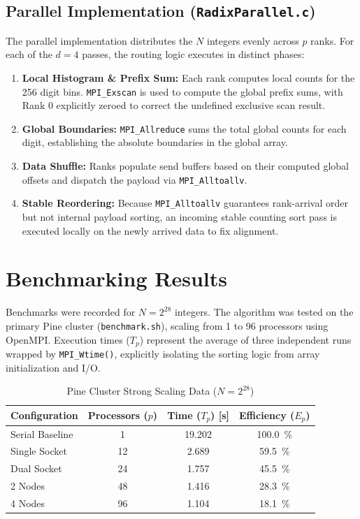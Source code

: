 \documentclass[11pt]{article}
\begin{document}
\subsection{Parallel Implementation (\texttt{RadixParallel.c})}
The parallel implementation distributes the $N$ integers evenly across $p$ ranks. For each of the $d=4$ passes, the routing logic executes in distinct phases:
\begin{enumerate}
  \item \textbf{Local Histogram \& Prefix Sum:} Each rank computes local counts for the 256 digit bins. \texttt{MPI\_Exscan} is used to compute the global prefix sums, with Rank 0 explicitly zeroed to correct the undefined exclusive scan result.
  \item \textbf{Global Boundaries:} \texttt{MPI\_Allreduce} sums the total global counts for each digit, establishing the absolute boundaries in the global array.
  \item \textbf{Data Shuffle:} Ranks populate send buffers based on their computed global offsets and dispatch the payload via \texttt{MPI\_Alltoallv}.
  \item \textbf{Stable Reordering:} Because \texttt{MPI\_Alltoallv} guarantees rank-arrival order but not internal payload sorting, an incoming stable counting sort pass is executed locally on the newly arrived data to fix alignment.
\end{enumerate}

\section{Benchmarking Results}
Benchmarks were recorded for $N = 2^{28}$ integers. The algorithm was tested on the primary Pine cluster (\texttt{benchmark.sh}), scaling from 1 to 96 processors using OpenMPI. Execution times ($T_p$) represent the average of three independent runs wrapped by \texttt{MPI\_Wtime()}, explicitly isolating the sorting logic from array initialization and I/O.

\begin{table}[H]
  \centering
  \caption{Pine Cluster Strong Scaling Data ($N = 2^{28}$)}
  \label{tab:pine}
  \begin{tabular}{lccc}
    \toprule
    \textbf{Configuration} & \textbf{Processors ($p$)} & \textbf{Time ($T_p$) [s]} & \textbf{Efficiency ($E_p$)} \\
    \midrule
    Serial Baseline  & 1  & 19.202 & \SI{100.0}{\percent} \\
    Single Socket    & 12 & 2.689  & \SI{59.5}{\percent}  \\
    Dual Socket      & 24 & 1.757  & \SI{45.5}{\percent}  \\
    2 Nodes          & 48 & 1.416  & \SI{28.3}{\percent}  \\
    4 Nodes          & 96 & 1.104  & \SI{18.1}{\percent}  \\
    \bottomrule
  \end{tabular}
\end{table}
\end{document}

